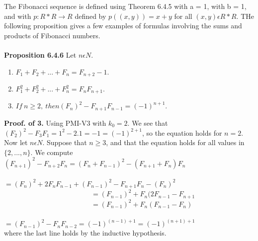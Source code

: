 \documentclass[a4paper,10pt]{report}
\begin{document}
The Fibonacci sequence is defined using Theorem 6.4.5 with a = 1, with b = 1, and with $p:R*R\rightarrow R$ defined by $p((x,y))=x+y$ for all $(x,y)\epsilon R*R$. THe following proposition gives a few examples of formulas involving the sums and products of Fibonacci numbers.
\\ \\ 
{\bf Proposition 6.4.6} Let $n\epsilon N$.
\begin{enumerate}
\item $F_1 + F_2 + . . . + F_n = F_{n+2} − 1$.
\item $F_1^2 + F_2^2 + . . . + F_n^2 = F_nF_{n+1}$.
\item $ If~ n\geq2,~ then (F_n)^2 − F_{n+1}F_{n−1}=(−1)^{n+1}$.
\end{enumerate}
{\bf Proof. of 3.} Using PMI-V3 with $k_0=2$. We see that $(F_2)^2-F_3F_1=1^2-2.1=-1=(-1)^{2+1}$, so the equation holds for $n=2$. Now let $n\epsilon N$. Suppose that $n\geq3$, and that the equation holds for all values in $\{2, . . ., n\}$. We compute \\
$(F_{n+1})^2 - F_{n+2}F_n=(F_n+F_{n-1})^2 - (F_{n+1}+F_n)F_n$\\
~~~~~~~~~~~~~~~~~~~~~~~~~$=(F_n)^2+2F_nF_{n-1}+(F_{n-1})^2-F_{n+1}F_n-(F_n)^2$\\
~~~~~~~~~~~~~~~~~~~~~~~~~$=(F_{n-1})^2+F_n(2F_{n-1}-F_{n+1}$\\
~~~~~~~~~~~~~~~~~~~~~~~~~$=(F_{n-1})^2+F_n(F_{n-1}-F_n)$\\
~~~~~~~~~~~~~~~~~~~~~~~~~$=(F_{n-1})^2-F_nF_{n-2}=(-1)^{(n-1)+1}=(-1)^{(n+1)+1}$ \\where the last line holds by the inductive hypothesis.
\end{document}
